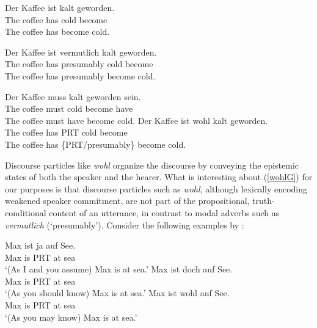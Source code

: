\documentclass[11pt]{article}
\begin{document}
\begin{exe}
	\ex\label{german} \begin{xlist}
		\ex\label{bareG} \gll Der Kaffee ist kalt geworden. \\
		The coffee has cold become\\
		\glt The coffee has become cold.
				
		\ex\label{probG} \gll Der Kaffee ist vermutlich kalt geworden.\\
				The coffee has presumably cold become\\
		\glt The coffee has presumably become cold.

		\ex\label{mustG} \gll Der Kaffee muss kalt geworden sein. \\
						The coffee must  cold become have\\
		\glt The coffee must have become cold.
		\ex\label{wohlG} \gll Der Kaffee ist wohl kalt geworden.\\
						The coffee has PRT cold become\\
		\glt The coffee has \{PRT/presumably\} become cold.
	\end{xlist}
\end{exe}

Discourse particles like \emph{wohl} organize the discourse by conveying the epistemic states of both the speaker and the hearer. What is interesting about (\ref{wohlG}) for our purposes is that discourse particles such as \emph{wohl}, although lexically encoding weakened speaker commitment, are not part of the propositional, truth-conditional content of an utterance, in contrast to modal adverbs such as \emph{vermutlich} (`presumably’). Consider the following examples by \citet[][p.~2013]{Zimmermann2011}:

\begin{exe}
\ex \label{dparticles}
\begin{xlist}
\ex \gll Max ist	ja auf See.\\
Max is	 PRT at sea\\
\trans `(As I and you assume) Max is at sea.'
\ex \gll Max ist doch auf See.\\
Max is	 PRT at sea\\
\trans `(As you should know) Max is at sea.'
\ex \gll Max ist wohl auf See.\\
Max is	PRT at	sea\\
\trans `(As you may know) Max is at sea.'
\end{xlist}
\end{exe}
\end{document}
